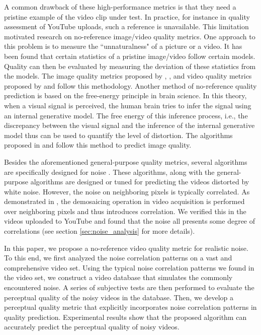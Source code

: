 \documentclass{sig-alternate}
\begin{document}
A common drawback of these high-performance metrics is that they need a pristine example of the video clip under test. In practice, for instance in quality assessment of YouTube uploads, such a reference is unavailable. This limitation motivated research on no-reference image/video quality metrics. One approach to this problem is to measure the ``unnaturalness" of a picture or a video. It has been found that certain statistics of a pristine image/video follow certain models\cite{SriLeeSimZhu2003}\cite{ZorWei2009}. Quality can then be evaluated by measuring the deviation of these statistics from the models. The image quality metrics proposed by \cite{NIQE}, \cite{DIIVINE}, \cite{HNR} and video quality metrics proposed by \cite{BLIINDS} and \cite{ZhuLiAsaSau2015} follow this methodology. Another method of no-reference quality prediction is based on the free-energy principle in brain science\cite{Fri2010}. In this theory, when a visual signal is perceived, the human brain tries to infer the signal using an internal generative model. The free energy of this inference process, i.e., the discrepancy between the visual signal and the inference of the internal generative model thus can be used to quantify the level of distortion. The algorithms proposed in \cite{LiuZhaZhaSunGuYan2014} and \cite{ZhaWuYanLinZha2012} follow this method to predict image quality.

Besides the aforementioned general-purpose quality metrics, several algorithms are specifically designed for noise \cite{LimPar2014,ZhaKauWanYan2013,ZhaWu2011}. These algorithms, along with the general-purpose algorithms are designed or tuned for predicting the videos distorted by white noise. However, the noise on neighboring pixels is typically correlated. As demonstrated in \cite{SeyKeiKnoSte2013}, the demosaicing operation in video acquisition is performed over neighboring pixels and thus introduces correlation. We verified this in the videos uploaded to YouTube and found that the noise all presents some degree of correlations (see section \ref{sec:noise_analysis} for more details).

In this paper, we propose a no-reference video quality metric for realistic noise. To this end, we first analyzed the noise correlation patterns on a vast and comprehensive video set. Using the typical noise correlation patterns we found in the video set, we construct a video database that simulates the commonly encountered noise. A series of subjective tests are then performed to evaluate the perceptual quality of the noisy videos in the database. Then, we develop a perceptual quality metric that explicitly incorporates noise correlation patterns in quality prediction. Experimental results show that the proposed algorithm can accurately predict the perceptual quality of noisy videos. 
\end{document}
